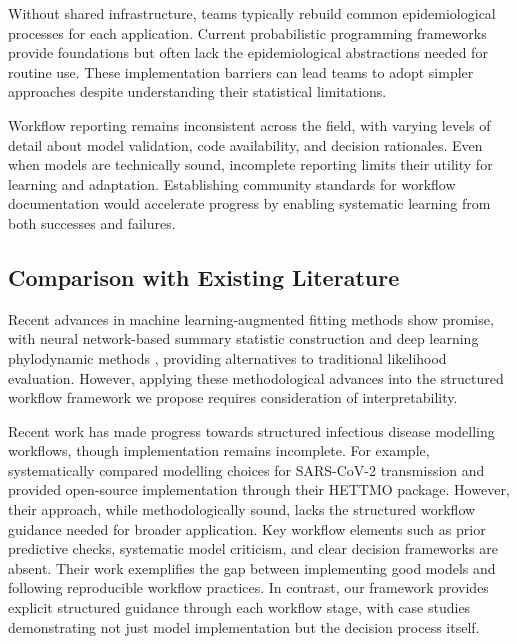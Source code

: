 \documentclass{article}
\begin{document}
Without shared infrastructure, teams typically rebuild common epidemiological processes for each application.
Current probabilistic programming frameworks provide foundations but often lack the epidemiological abstractions needed for routine use.
These implementation barriers can lead teams to adopt simpler approaches despite understanding their statistical limitations.

Workflow reporting remains inconsistent across the field, with varying levels of detail about model validation, code availability, and decision rationales.
Even when models are technically sound, incomplete reporting limits their utility for learning and adaptation.
Establishing community standards for workflow documentation would accelerate progress by enabling systematic learning from both successes and failures.

\subsection{Comparison with Existing Literature}

Recent advances in machine learning-augmented fitting methods show promise, with neural network-based summary statistic construction \citep{raynal2019abc} and deep learning phylodynamic methods \citep{voznica2022deep}, providing alternatives to traditional likelihood evaluation. However, applying these methodological advances into the structured workflow framework we propose requires consideration of interpretability.

Recent work has made progress towards structured infectious disease modelling workflows, though implementation remains incomplete.
For example, \citet{bouman2024bayesian} systematically compared modelling choices for SARS-CoV-2 transmission and provided open-source implementation through their HETTMO package.
However, their approach, while methodologically sound, lacks the structured workflow guidance needed for broader application.
Key workflow elements such as prior predictive checks, systematic model criticism, and clear decision frameworks are absent.
Their work exemplifies the gap between implementing good models and following reproducible workflow practices.
In contrast, our framework provides explicit structured guidance through each workflow stage, with case studies demonstrating not just model implementation but the decision process itself.
\end{document}
